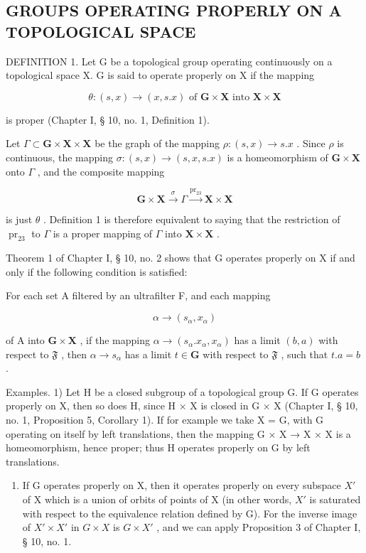 \subsection{GROUPS OPERATING PROPERLY ON A TOPOLOGICAL SPACE}

DEFINITION 1. Let G be a topological group operating continuously on a topological space X. G is said to operate properly on X if the mapping

\[
\theta : (s, x) \rightarrow (x, s. x) \text{ of } \mathbf{G} \times \mathbf{X} \text{ into } \mathbf{X} \times \mathbf{X}
\]

is proper (Chapter I, § 10, no. 1, Definition 1).

Let \(\Gamma \subset \mathbf{G} \times \mathbf{X} \times \mathbf{X}\) be the graph of the mapping \(\rho: (s, x) \to s.x\) . Since \(\rho\) is continuous, the mapping \(\sigma: (s, x) \to (s, x, s.x)\) is a homeomorphism of \(\mathbf{G} \times \mathbf{X}\) onto \(\Gamma\) , and the composite mapping

\[
\mathbf {G} \times \mathbf {X} \xrightarrow {\sigma} \Gamma \xrightarrow {\mathrm{pr} _ {2 3}} \mathbf {X} \times \mathbf {X}
\]

is just \(\theta\) . Definition 1 is therefore equivalent to saying that the restriction of \(\operatorname{pr}_{23}\) to \(\Gamma\) is a proper mapping of \(\Gamma\) into \(\mathbf{X} \times \mathbf{X}\) .

Theorem 1 of Chapter I, § 10, no. 2 shows that G operates properly on X if and only if the following condition is satisfied:

For each set A filtered by an ultrafilter F, and each mapping

\[
\alpha \rightarrow (s _ {\alpha}, x _ {\alpha})
\]

of A into \(\mathbf{G} \times \mathbf{X}\) , if the mapping \(\alpha \to (s_{\alpha}.x_{\alpha}, x_{\alpha})\) has a limit \((b, a)\) with respect to \(\mathfrak{F}\) , then \(\alpha \to s_{\alpha}\) has a limit \(t \in \mathbf{G}\) with respect to \(\mathfrak{F}\) , such that \(t.a = b\) .

Examples. 1) Let H be a closed subgroup of a topological group G. If G operates properly on X, then so does H, since H × X is closed in G × X (Chapter I, § 10, no. 1, Proposition 5, Corollary 1). If for example we take X = G, with G operating on itself by left translations, then the mapping G × X → X × X is a homeomorphism, hence proper; thus H operates properly on G by left translations.

\begin{enumerate}
\def\labelenumi{\arabic{enumi})}
\setcounter{enumi}{1}
\tightlist
\item
  If G operates properly on X, then it operates properly on every subspace \(X'\) of X which is a union of orbits of points of X (in other words, \(X'\) is saturated with respect to the equivalence relation defined by G). For the inverse image of \(X' \times X'\) in \(G \times X\) is \(G \times X'\) , and we can apply Proposition 3 of Chapter I, § 10, no. 1.
\end{enumerate}

